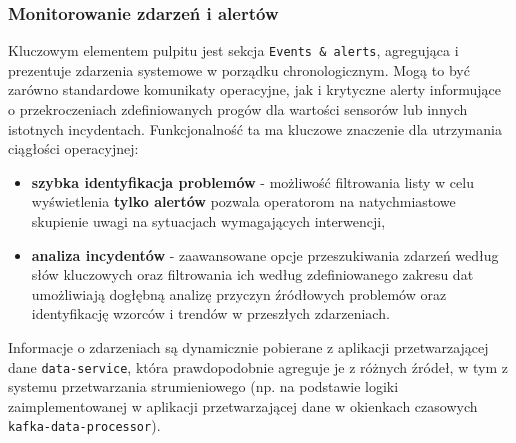 \subsubsection{Monitorowanie zdarzeń i alertów}
Kluczowym elementem pulpitu jest sekcja \texttt{Events \& alerts}, agregująca i prezentuje zdarzenia systemowe w porządku chronologicznym. Mogą to być zarówno standardowe komunikaty operacyjne, jak i krytyczne alerty informujące o przekroczeniach zdefiniowanych progów dla wartości sensorów lub innych istotnych incydentach. Funkcjonalność ta ma kluczowe znaczenie dla utrzymania ciągłości operacyjnej:
\begin{itemize}
    \item \textbf{szybka identyfikacja problemów} - możliwość filtrowania listy w celu wyświetlenia \textbf{tylko alertów} pozwala operatorom na natychmiastowe skupienie uwagi na sytuacjach wymagających interwencji,
    \item \textbf{analiza incydentów} - zaawansowane opcje przeszukiwania zdarzeń według słów kluczowych oraz filtrowania ich według zdefiniowanego zakresu dat umożliwiają dogłębną analizę przyczyn źródłowych problemów oraz identyfikację wzorców i trendów w przeszłych zdarzeniach.
\end{itemize}
Informacje o zdarzeniach są dynamicznie pobierane z aplikacji przetwarzającej dane \texttt{data-service}, która prawdopodobnie agreguje je z różnych źródeł, w tym z systemu przetwarzania strumieniowego (np. na podstawie logiki zaimplementowanej w aplikacji przetwarzającej dane w okienkach czasowych \texttt{kafka-data-processor}).

